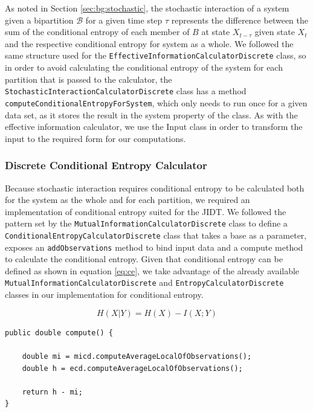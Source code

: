 \documentclass[a4paper,11pt]{article}
\begin{document}
As noted in Section \ref{sec:bg:stochastic}, the stochastic interaction of a system given a bipartition $\mathcal{B}$ for a given time step $\tau$ represents the difference between the sum of the conditional entropy of each member of $B$ at state $X_{t-\tau}$ given state $X_t$ and the respective conditional entropy for system as a whole. We followed the same structure used for the \texttt{EffectiveInformationCalculatorDiscrete} class, so in order to avoid calculating the conditional entropy of the system for each partition that is passed to the calculator, the \texttt{StochasticInteractionCalculatorDiscrete} class has a method \texttt{computeConditionalEntropyForSystem}, which only needs to run once for a given data set, as it stores the result in the system property of the class. As with the effective information calculator, we use the Input class in order to transform the input to the required form for our computations.

\subsubsection{Discrete Conditional Entropy Calculator}

Because stochastic interaction requires conditional entropy to be calculated both for the system as the whole and for each partition, we required an implementation of conditional entropy suited for the JIDT. We followed the pattern set by the \texttt{MutualInformationCalculatorDiscrete} class to define a \texttt{ConditionalEntropyCalculatorDiscrete} class that takes a base as a parameter, exposes an \texttt{addObservations} method to bind input data and a compute method to calculate the conditional entropy. Given that conditional entropy can be defined as shown in equation \ref{eq:ce}, we take advantage of the already available \texttt{MutualInformationCalculatorDiscrete} and \texttt{EntropyCalculatorDiscrete} classes in our implementation for conditional entropy.

\begin{equation} \label{eq:ce}
H(X|Y) = H(X) - I(X; Y)
\end{equation}

\begin{verbatim}
public double compute() {

	double mi = micd.computeAverageLocalOfObservations();
	double h = ecd.computeAverageLocalOfObservations();

	return h - mi;
}
\end{verbatim}
\end{document}
